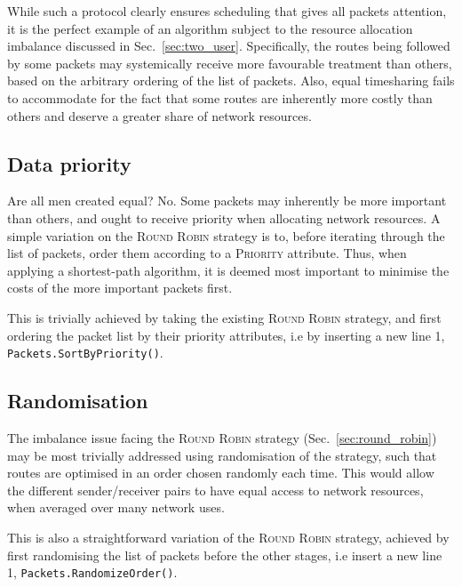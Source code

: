\documentclass[aps, rmp, twocolumn, amsmath, amssymb, nofootinbib, superscriptaddress, longbibliography, floatfix, table-of-contents, eqsecnum]{revtex4-1}
\begin{document}
While such a protocol clearly ensures scheduling that gives all packets attention, it is the perfect example of an algorithm subject to the resource allocation imbalance discussed in Sec.~\ref{sec:two_user}. Specifically, the routes being followed by some packets may systemically receive more favourable treatment than others, based on the arbitrary ordering of the list of packets. Also, equal timesharing fails to accommodate for the fact that some routes are inherently more costly than others and deserve a greater share of network resources.

%
%

\subsection{Data priority} \label{sec:data_priority} 

Are all men created equal? No. Some packets may inherently be more important than others, and ought to receive priority when allocating network resources. A simple variation on the \textsc{Round Robin} strategy is to, before iterating through the list of packets, order them according to a \textsc{Priority} attribute. Thus, when applying a shortest-path algorithm, it is deemed most important to minimise the costs of the more important packets first.

This is trivially achieved by taking the existing \textsc{Round Robin} strategy, and first ordering the packet list by their priority attributes, i.e by inserting a new line 1, \mbox{\texttt{Packets.SortByPriority()}}.

%
%

\subsection{Randomisation} \label{sec:random} 

The imbalance issue facing the \textsc{Round Robin} strategy (Sec.~\ref{sec:round_robin}) may be most trivially addressed using randomisation of the strategy, such that routes are optimised in an order chosen randomly each time. This would allow the different sender/receiver pairs to have equal access to network resources, when averaged over many network uses.

This is also a straightforward variation of the \textsc{Round Robin} strategy, achieved by first randomising the list of packets before the other stages, i.e insert a new line 1, \mbox{\texttt{Packets.RandomizeOrder()}}.
\end{document}
